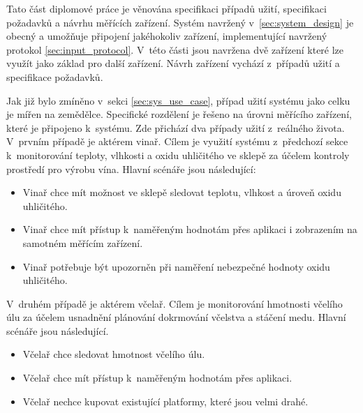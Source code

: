 \label{sec:device_design}
Tato část diplomové práce je věnována specifikaci případů užití, specifikaci požadavků a návrhu měřících zařízení. Systém navržený v~\ref{sec:system_design} je obecný a umožňuje připojení jakéhokoliv zařízení, implementující navržený protokol \ref{sec:input_protocol}. V~této části jsou navržena dvě zařízení které lze využít jako základ pro další zařízení. Návrh zařízení vychází z~případů užití a specifikace požadavků. 

\label{c}
Jak již bylo zmíněno v~sekci \ref{sec:sys_use_case}, případ užití systému jako celku je mířen na zemědělce. Specifické rozdělení je řešeno na úrovni měřícího zařízení, které je připojeno k~systému. Zde přichází dva případy užití z~reálného života. V~prvním případě je aktérem vinař. Cílem je využití systému z~předchozí sekce k~monitorování teploty, vlhkosti a oxidu uhličitého ve sklepě za účelem kontroly prostředí pro výrobu vína. Hlavní scénáře jsou následující:
\begin{itemize}
    \item Vinař chce mít možnost ve sklepě sledovat teplotu, vlhkost a úroveň oxidu uhličitého.
    \item Vinař chce mít přístup k~naměřeným hodnotám přes aplikaci i zobrazením na samotném měřícím zařízení.
    \item Vinař potřebuje být upozorněn při naměření nebezpečné hodnoty oxidu uhličitého.
\end{itemize}
V~druhém případě je aktérem včelař. Cílem je monitorování hmotnosti včelího úlu za účelem usnadnění plánování dokrmování včelstva a stáčení medu. Hlavní scénáře jsou následující.
\begin{itemize}
    \item Včelař chce sledovat hmotnost včelího úlu.
    \item Včelař chce mít přístup k~naměřeným hodnotám přes aplikaci.
    \item Včelař nechce kupovat existující platformy, které jsou velmi drahé.
\end{itemize}

